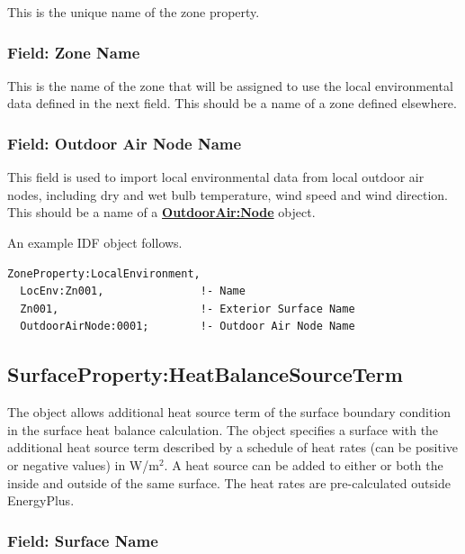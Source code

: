 This is the unique name of the zone property.

\subsubsection{Field: Zone Name}\label{ZonePropertylocalEnvironment-field-zone-name}

This is the name of the zone that will be assigned to use the local environmental data defined in the next field. This should be a name of a zone defined elsewhere.

\subsubsection{Field: Outdoor Air Node Name}\label{field-zone-outdoor-air-node-name}

This field is used to import local environmental data from local outdoor air nodes, including dry and wet bulb temperature, wind speed and wind direction. This should be a name of a \textbf{\hyperref[outdoorairnode]{OutdoorAir:Node}} object.

An example IDF object follows.

\begin{lstlisting}
ZoneProperty:LocalEnvironment,
  LocEnv:Zn001,               !- Name
  Zn001,                      !- Exterior Surface Name
  OutdoorAirNode:0001;        !- Outdoor Air Node Name
\end{lstlisting}

\subsection{SurfaceProperty:HeatBalanceSourceTerm}\label{surfacePropertyHeatBalanceSourceTerm}

The object allows additional heat source term of the surface boundary condition in the surface heat balance calculation. The object specifies a surface with the additional heat source term described by a schedule of heat rates (can be positive or negative values) in W/m\(^2\). A heat source can be added	to either or both the inside and outside of the same surface. The heat rates are pre-calculated outside EnergyPlus.

\subsubsection{Field: Surface Name}\label{surfacePropertyHeatBalanceSourceTerm-field-surface-name}

